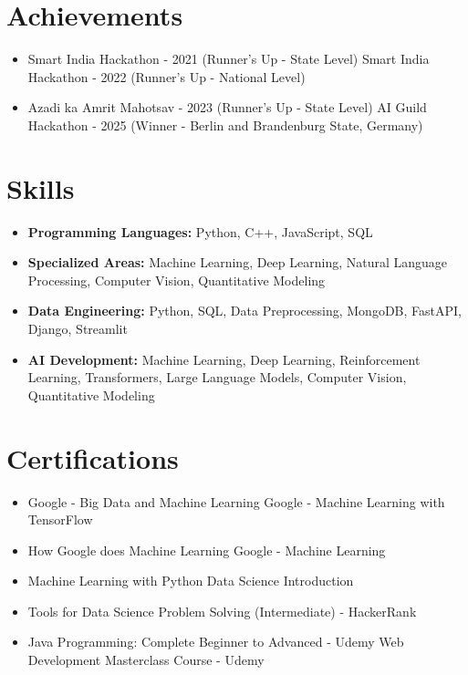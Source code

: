 \documentclass[a4paper,10pt]{article}
\begin{document}
\section*{Achievements}
\begin{itemize}
\item Smart India Hackathon - 2021 (Runner's Up - State Level) \hfill Smart India Hackathon - 2022 (Runner's Up - National Level)
\item Azadi ka Amrit Mahotsav - 2023 (Runner's Up - State Level) \hfill AI Guild Hackathon - 2025 (Winner - Berlin and Brandenburg State, Germany)
\end{itemize}

\section*{Skills}
\begin{itemize}
  \item \textbf{Programming Languages:} Python, C++, JavaScript, SQL
  \item \textbf{Specialized Areas:} Machine Learning, Deep Learning, Natural Language Processing, Computer Vision, Quantitative Modeling
  \item \textbf{Data Engineering:} Python, SQL, Data Preprocessing, MongoDB, FastAPI, Django, Streamlit
  \item \textbf{AI Development:} Machine Learning, Deep Learning, Reinforcement Learning, Transformers, Large Language Models, Computer Vision, Quantitative Modeling
\end{itemize}

\section*{Certifications}
\begin{itemize}
\item Google - Big Data and Machine Learning \hfill Google - Machine Learning with TensorFlow
\item How Google does Machine Learning \hfill Google - Machine Learning
\item Machine Learning with Python \hfill Data Science Introduction
\item Tools for Data Science \hfill Problem Solving (Intermediate) - HackerRank
\item Java Programming: Complete Beginner to Advanced - Udemy \hfill Web Development Masterclass Course - Udemy
\end{itemize}
\end{document}
